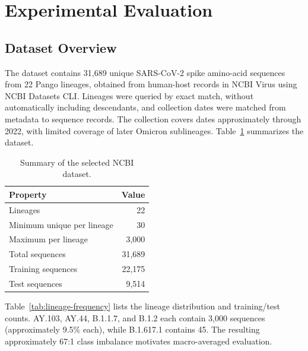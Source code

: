 \documentclass[conference]{IEEEtran}
\begin{document}
\section{Experimental Evaluation}
\label{sec:experiment}

\subsection{Dataset Overview}
\label{sec:dataset}

The dataset contains 31,689 unique SARS-CoV-2 spike amino-acid sequences from 22 Pango lineages, obtained from human-host records in NCBI Virus using NCBI Datasets CLI. Lineages were queried by exact match, without automatically including descendants, and collection dates were matched from metadata to sequence records. The collection covers dates approximately through 2022, with limited coverage of later Omicron sublineages. Table~\ref{tab:dataset-summary} summarizes the dataset.

\begin{table}[!t]
    \centering
    \caption{Summary of the selected NCBI dataset.}
    \label{tab:dataset-summary}
    \small
    \setlength{\tabcolsep}{0pt}
    \renewcommand{\arraystretch}{1.15}
    \begin{tabular*}{\columnwidth}{@{\extracolsep{\fill}}lr@{}}
        \toprule
        Property & Value \\
        \midrule
        Lineages & 22 \\
        Minimum unique per lineage & 30 \\
        Maximum per lineage & 3,000 \\
        Total sequences & 31,689 \\
        Training sequences & 22,175 \\
        Test sequences & 9,514 \\
        \bottomrule
    \end{tabular*}
\end{table}

Table~\ref{tab:lineage-frequency} lists the lineage distribution and training/test counts. AY.103, AY.44, B.1.1.7, and B.1.2 each contain 3,000 sequences (approximately 9.5\% each), while B.1.617.1 contains 45. The resulting approximately 67:1 class imbalance motivates macro-averaged evaluation.
\end{document}
